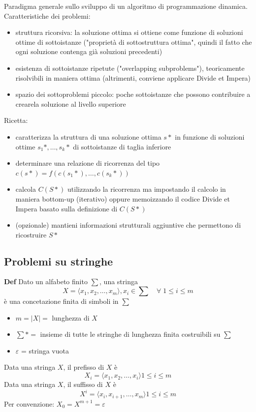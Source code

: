 Paradigma generale sullo sviluppo di un algoritmo di programmazione dinamica. Caratteristiche dei problemi:
\begin{itemize}
    \item struttura ricorsiva: la soluzione ottima si ottiene come funzione di soluzioni ottime di sottoistanze ("proprietà di sottostruttura ottima", quindi il fatto che ogni soluzione contenga già soluzioni precedenti)
    \item esistenza di sottoistanze ripetute ("overlapping subproblems"), teoricamente risolvibili in maniera ottima (altrimenti, conviene applicare Divide et Impera)
    \item spazio dei sottoproblemi piccolo: poche sottoistanze che possono contribuire a crearela soluzione al livello superiore
\end{itemize}

Ricetta:
\begin{itemize}
    \item caratterizza la struttura di una soluzione ottima $s*$ in funzione di soluzioni ottime $s_1*, \ldots, s_k*$ di sottoistanze di taglia inferiore
    \item determinare una relazione di ricorrenza del tipo $c(s*) = f(c(s_1*), \ldots, c(s_k*))$
    \item calcola $C(S*)$ utilizzando la ricorrenza ma impostando il calcolo in maniera bottom-up (iterativo) oppure memoizzando il codice Divide et Impera basato sulla definizione di $C(S*)$
    \item (opzionale) mantieni informazioni strutturali aggiuntive che permettono di ricostruire $S*$
\end{itemize}

\newpage
\subsection{Problemi su stringhe}
\begin{mdframed}
    \textbf{Def} Dato un alfabeto finito $\sum$, una stringa
    \begin{equation*}
        X = \langle x_1, x_2, \ldots, x_m \rangle, x_i \in \sum \quad \forall\; 1 \leq i \leq m
    \end{equation*}
    è una concetazione finita di simboli in $\sum$
    \begin{itemize}
        \item $m = |X| =$ lunghezza di $X$
        \item $\sum* =$ insieme di tutte le stringhe di lunghezza finita costruibili su $\sum$
        \item $\varepsilon$ = stringa vuota
    \end{itemize}
    Data una stringa $X$, il prefisso di $X$ è
    \begin{equation*}
        X_i = \langle x_1, x_2, \ldots, x_i \rangle 1 \leq i \leq m
    \end{equation*}
    Data una stringa $X$, il suffisso di $X$ è
    \begin{equation*}
        X^i = \langle x_i, x_{i+1}, \ldots, x_m \rangle 1 \leq i \leq m
    \end{equation*}
    Per convenzione: $X_0 = X^{m+1} = \varepsilon$
\end{mdframed}

